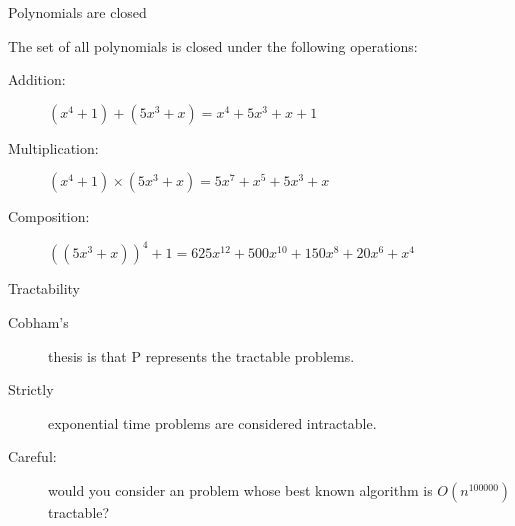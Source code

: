 \begin{frame}[fragile]{Polynomials are closed}
  
  
  The set of all polynomials is closed under the following operations:
  \begin{description}
    \item[Addition:] \( (x^4 + 1) + (5 x^3 + x) = x^4 + 5 x^3 + x + 1 \)
    \item[Multiplication:] \( (x^4 + 1) \times (5 x^3 + x) = 5 x^7 + x^5 + 5 x^3 + x \)
    \item[Composition:] \( ((5 x^3 + x))^4 + 1  = 625x^{12} + 500 x^{10} + 150x^8 + 20x^6 + x^4 \)
  \end{description}


\end{frame}


\begin{frame}{Tractability}
  
  \begin{description}
    \item[Cobham's] thesis is that P represents the tractable problems.
    \item[Strictly] exponential time problems are considered intractable.
    \item[Careful:] would you consider an problem whose best known algorithm is $O(n^{100000})$ tractable?
  \end{description}


\end{frame}